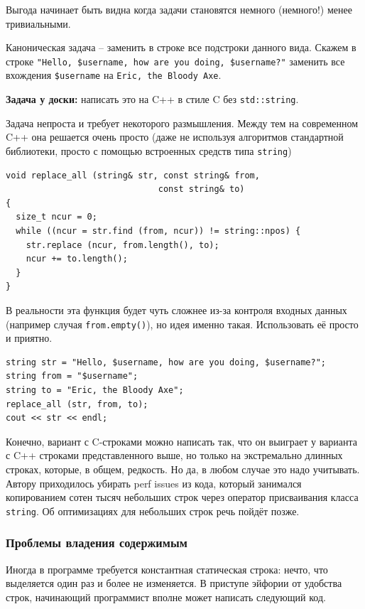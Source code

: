 \documentclass[a4paper,12pt,oneside]{article}
\begin{document}
Выгода начинает быть видна когда задачи становятся немного (немного!) менее тривиальными.

Каноническая задача -- заменить в строке все подстроки данного вида. Скажем в строке \lstinline!"Hello, $username, how are you doing, $username?"! заменить все вхождения \lstinline!$username! на \lstinline!Eric, the Bloody Axe!.

\textbf{Задача у доски:} написать это на C++ в стиле C без \lstinline!std::string!.

Задача непроста и требует некоторого размышления. Между тем на современном C++ она решается очень просто (даже не используя алгоритмов стандартной библиотеки, просто с помощью встроенных средств типа \lstinline!string!)

\begin{lstlisting}
void replace_all (string& str, const string& from, 
                              const string& to) 
{
  size_t ncur = 0;
  while ((ncur = str.find (from, ncur)) != string::npos) {
    str.replace (ncur, from.length(), to);
    ncur += to.length(); 
  }
}
\end{lstlisting}

В реальности эта функция будет чуть сложнее из-за контроля входных данных (например случая \lstinline!from.empty()!), но идея именно такая. Использовать её просто и приятно.

\begin{lstlisting}
string str = "Hello, $username, how are you doing, $username?";
string from = "$username";
string to = "Eric, the Bloody Axe";
replace_all (str, from, to);
cout << str << endl;
\end{lstlisting}

Конечно, вариант с C-строками можно написать так, что он выиграет у варианта с C++ строками представленного выше, но только на экстремально длинных строках, которые, в общем, редкость. Но да, в любом случае это надо учитывать. Автору приходилось убирать perf issues из кода, который занимался копированием сотен тысяч небольших строк через оператор присваивания класса \lstinline!string!. Об оптимизациях для небольших строк речь пойдёт позже. 

\subsubsection{Проблемы владения содержимым}\label{subsub:stringview}

Иногда в программе требуется константная статическая строка: нечто, что выделяется один раз и более не изменяется. В приступе эйфории от удобства строк, начинающий программист вполне может написать следующий код.
\end{document}
